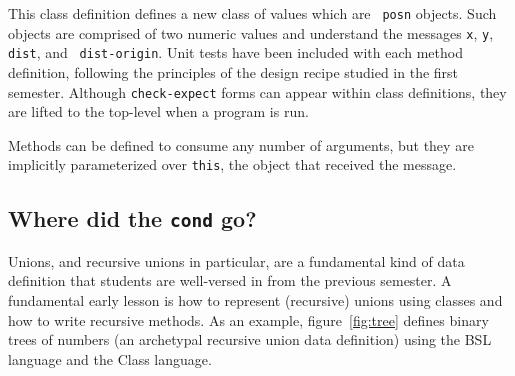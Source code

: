 \documentclass[submission,copyright]{eptcs}
\begin{document}
This class definition defines a new class of values which are {\tt
  posn} objects.  Such objects are comprised of two numeric values and
understand the messages {\tt x}, {\tt y}, {\tt dist}, and {\tt
  dist-origin}.  Unit tests have been included with each method
definition, following the principles of the design recipe studied in
the first semester.  Although {\tt check-expect} forms can appear
within class definitions, they are lifted to the top-level when a
program is run.

Methods can be defined to consume any number of arguments, but they
are implicitly parameterized over {\tt this}, the object that received
the message.

\subsection{Where did the {\tt cond} go?}

Unions, and recursive unions in particular, are a fundamental kind of
data definition that students are well-versed in from the previous
semester.  A fundamental early lesson is how to represent (recursive)
unions using classes and how to write recursive methods.  As an
example, figure~\ref{fig:tree} defines binary trees of numbers
(an archetypal recursive union data definition)
using the BSL language and the Class language.


\end{document}
